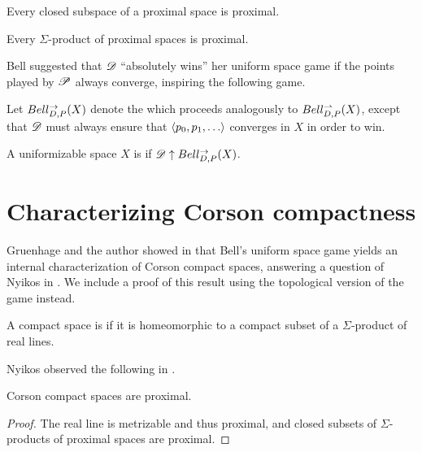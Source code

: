 \begin{thm}
  Every closed subspace of a proximal space is proximal.
\end{thm}

\begin{thm}
  Every $\Sigma$-product of proximal spaces is proximal.
\end{thm}

Bell suggested that $\mathscr{D}$ ``absolutely wins'' her uniform space game
if the points played by $\mathscr{P}$ always converge, inspiring the following game.

\begin{defn}
  Let $Bell_{D,P}^{\to}(X)$ denote the
   which
  proceeds analogously to $Bell_{D,P}^{\rightharpoonup}(X)$, except
  that $\mathscr{D}$ must always ensure that $\<p_0,p_1,\dots\>$ converges
  in $X$ in order to win.
\end{defn}

\begin{defn}
  A uniformizable space $X$ is  if
  $\mathscr{D} \uparrow Bell_{D,P}^{\to}(X)$.
\end{defn}



\section{Characterizing Corson compactness}

Gruenhage and the author showed in \cite{MR3227201} that Bell's uniform space
game yields an internal characterization of Corson compact spaces, answering
a question of Nyikos in \cite{nyikosProximalPreprint}. We include a proof
of this result using the topological version of the game instead.

\begin{defn}
  A compact space is  if it is homeomorphic to a compact
  subset of a $\Sigma$-product of real lines.
\end{defn}

Nyikos observed the following in \cite{nyikosProximalPreprint}.

\begin{prop}
  Corson compact spaces are proximal.
\end{prop}

\begin{proof}
  The real line is metrizable and thus proximal, and closed subsets of
  $\Sigma$-products of proximal spaces are proximal.
\end{proof}

